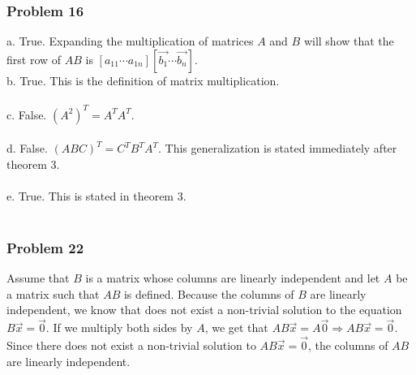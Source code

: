 \documentclass{article}%
\begin{document}
\subsubsection{Problem 16}
a. True. Expanding the multiplication of matrices $A$ and $B$ will show that the first row of $AB$
is $[a_{11} \cdots a_{1n}][\vec{b_1} \cdots \vec{b_n}]$.
\\
b. True. This is the definition of matrix multiplication.\\
\\
c. False. $(A^2)^T = A^TA^T$.\\
\\
d. False. $(ABC)^T = C^TB^TA^T$. This generalization is stated immediately after theorem 3.\\
\\
e. True. This is stated in theorem 3.\\
\\

\subsubsection{Problem 22}
Assume that $B$ is a matrix whose columns are linearly independent and let $A$ be a matrix such that $AB$ is
defined. Because the columns of $B$ are linearly independent, we know that does not exist a non-trivial solution
to the equation $B\vec{x} = \vec{0}$. If we multiply both sides by $A$, we get that
$AB\vec{x} = A\vec{0} \Rightarrow AB\vec{x} = \vec{0}$. Since there does not exist a non-trivial solution to
$AB\vec{x} = \vec{0}$, the columns of $AB$ are linearly independent.
\end{document}
